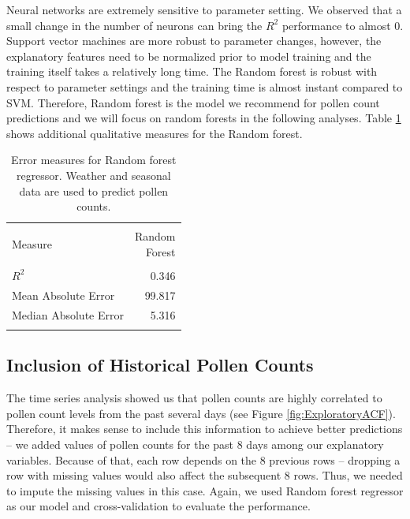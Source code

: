 \documentclass[a4paper,11pt]{article}
\begin{document}
\noindent
Neural networks are extremely sensitive to parameter setting. We observed that a small change in the number of neurons can bring the $R^2$ performance to almost 0. Support vector machines are more robust to parameter changes, however, the explanatory features need to be normalized prior to model training and the training itself takes a relatively long time. The Random forest is robust with respect to parameter settings and the training time is almost instant compared to SVM. Therefore, Random forest is the model we recommend for pollen count predictions and we will focus on random forests in the following analyses. Table \ref{tab:scores} shows additional qualitative measures for the Random forest.
\begin{table}
	\centering
	\begin{tabular}{lr}
		\hline \\
		\vspace{0.6em}
		Measure & \pbox{20cm}{Random \\ Forest}  \\
		\hline \\
		\vspace{0.2em}
		$R^2$ & 0.346 \\ 
		\vspace{0.2em}
		Mean Absolute Error & 99.817 \\
		\vspace{0.2em}
		Median Absolute Error & 5.316 \\ \vspace{-0.4em} \\
		\hline
	\end{tabular}
	\caption{Error measures for Random forest regressor. Weather and seasonal data are used to predict pollen counts.}
	\label{tab:scores}
\end{table}

\subsection{Inclusion of Historical Pollen Counts}
\label{sec:history}
The time series analysis showed us that pollen counts are highly correlated to pollen count levels from the past several days (see Figure \ref{fig:ExploratoryACF}). Therefore, it makes sense to include this information to achieve better predictions -- we added values of pollen counts for the past 8 days among our explanatory variables. Because of that, each row depends on the 8 previous rows -- dropping a row with missing values would also affect the subsequent 8 rows. Thus, we needed to impute the missing values in this case. Again, we used Random forest regressor as our model and cross-validation to evaluate the performance.
\end{document}
